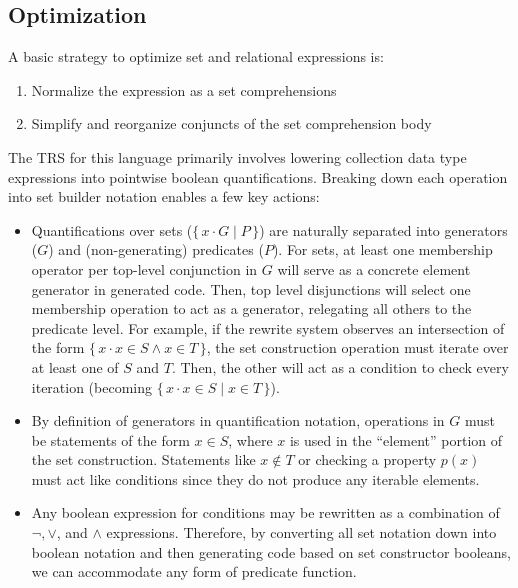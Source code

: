 \documentclass{article}
\newcommand{\bSet}[3]{%
  \{\, #1 \cdot #2 \mid #3 \, \}%
}
\newcommand{\bSetT}[2]{%
  \{\, #1 \cdot #2 \,\}%
}
\begin{document}
\subsection{Optimization}


A basic strategy to optimize set and relational expressions is:
\begin{enumerate}
  \item Normalize the expression as a set comprehensions
  \item Simplify and reorganize conjuncts of the set comprehension body
\end{enumerate}

The TRS for this language primarily involves lowering collection data type expressions into pointwise boolean quantifications. Breaking down each operation into set builder notation enables a few key actions:
\begin{itemize}
  \item Quantifications over sets ($\bSet{x}{G}{P}$) are naturally separated into generators ($G$) and (non-generating) predicates ($P$). For sets, at least one membership operator per top-level conjunction in $G$ will serve as a concrete element generator in generated code. Then, top level disjunctions will select one membership operation to act as a generator, relegating all others to the predicate level. For example, if the rewrite system observes an intersection of the form $\bSetT{x}{x \in S \land x \in T}$, the set construction operation must iterate over at least one of $S$ and $T$. Then, the other will act as a condition to check every iteration (becoming $\bSet{x}{x \in S}{x \in T}$).
  \item By definition of generators in quantification notation, operations in $G$ must be statements of the form $x \in S$, where $x$ is used in the ``element'' portion of the set construction. Statements like $x \notin T$ or checking a property $p(x)$ must act like conditions since they do not produce any iterable elements.
  \item Any boolean expression for conditions may be rewritten as a combination of $\lnot, \lor$, and $\land$ expressions. Therefore, by converting all set notation down into boolean notation and then generating code based on set constructor booleans, we can accommodate any form of predicate function.
\end{itemize}
\end{document}

